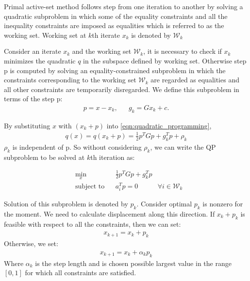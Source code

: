 Primal active-set method follows step from one iteration to another by solving a quadratic subproblem in which some of the equality constraints and all the inequality constraints are imposed as equalities which is referred to as the working set. Working set at $k$th iterate $x_k$ is denoted by $\mathcal{W}_k$

Consider an iterate $x_k$ and the working set $\mathcal{W}_k$, it is necessary to check if $x_k$ minimizes the quadratic $q$ in the subspace defined by working set. Otherwise step p is computed by solving an equality-constrained subproblem in which the constraints corresponding to the working set $\mathcal{W}_k$ are regarded as equalities and all other constraints are temporarily disregarded. We define this subproblem in terms of the step p:
\begin{equation*}
	\begin{aligned}
		p = x - x_k, & & g_k = Gx_k + c.
	\end{aligned}
\end{equation*}

By substituting $x$ with $(x_k+p)$ into \ref{eqn:quadratic_programming},
\begin{equation*}
	\begin{aligned}
		q(x) = q(x_k+p)= \frac{1}{2}p^TGp+g_k^Tp+\rho_k
	\end{aligned}
\end{equation*}
$\rho_k$ is independent of p. So without considering $\rho_k$, we can write the QP subproblem to be solved at $k$th iteration as:

\begin{equation}
	\begin{aligned}
		& \underset{x}{\text{min}} & & \frac{1}{2}p^{T}Gp+g_{k}^{T}p \\
& \text{subject to} & &  a_{i}^{T}p = 0 & \forall i\in \mathcal{W}_k
	\end{aligned}
	\label{eqn:Active_set_1}
\end{equation}

Solution of this subproblem is denoted by $p_k$. Consider optimal $p_k$ is nonzero for the moment. We need to calculate displacement along this direction. If $x_k+p_k$ is feasible with respect to all the constraints, then we can set:
\begin{equation*}
\begin{aligned}
	x_{k+1} = x_k + p_k
\end{aligned}
\end{equation*} 
Otherwise, we set:
\begin{equation}
	\begin{aligned}
		x_{k+1} = x_k + \alpha_{k}p_{k}
	\end{aligned}
	\label{eqn:Active_set_2}
\end{equation}
Where $\alpha_k$ is the step length and is chosen possible largest value in the range $[0,1]$ for which all constraints are satisfied.

